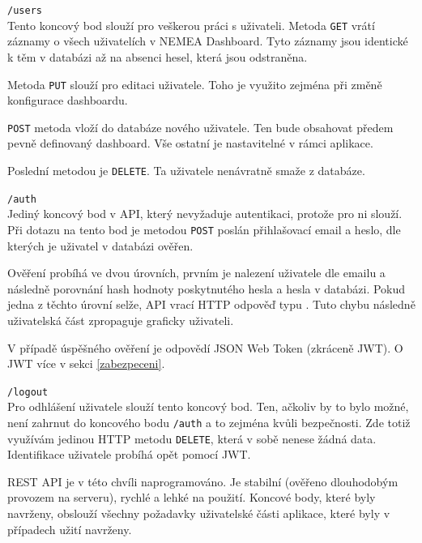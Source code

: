 \begin{description}
    \item \texttt{/users}\\
        Tento koncový bod slouží pro veškerou práci s uživateli. Metoda \texttt{GET} vrátí záznamy o všech uživatelích v NEMEA Dashboard. Tyto záznamy jsou identické k těm v databázi až na absenci hesel, která jsou odstraněna.

        Metoda \texttt{PUT} slouží pro editaci uživatele. Toho je využito zejména při změně konfigurace dashboardu.

        \texttt{POST} metoda vloží do databáze nového uživatele. Ten bude obsahovat předem pevně definovaný dashboard. Vše ostatní je nastavitelné v rámci aplikace.

        Poslední metodou je \texttt{DELETE}. Ta uživatele nenávratně smaže z databáze.

    \item \texttt{/auth}\\
        Jediný koncový bod v API, který nevyžaduje autentikaci, protože pro ni slouží. Při dotazu na tento bod je metodou \texttt{POST} poslán přihlašovací email a heslo, dle kterých je uživatel v databázi ověřen.

        Ověření probíhá ve dvou úrovních, prvním je nalezení uživatele dle emailu a následně porovnání hash hodnoty poskytnutého hesla a hesla v databázi. Pokud jedna z těchto úrovní selže, API vrací HTTP odpověď typu . Tuto chybu následně uživatelská část zpropaguje graficky uživateli.

        V případě úspěšného ověření je odpovědí JSON Web Token (zkráceně JWT)\cite{rfc:jwt}. O JWT více v sekci \ref{zabezpeceni}.

    \item \texttt{/logout}\\
        Pro odhlášení uživatele slouží tento koncový bod. Ten, ačkoliv by to bylo možné, není zahrnut do koncového bodu \texttt{/auth} a to zejména kvůli bezpečnosti. Zde totiž využívám jedinou HTTP metodu \texttt{DELETE}, která v sobě nenese žádná data. Identifikace uživatele probíhá opět pomocí JWT.
\end{description}

REST API je v této chvíli naprogramováno. Je stabilní (ověřeno dlouhodobým provozem na serveru), rychlé a lehké na použití. Koncové body, které byly navrženy, obslouží všechny požadavky uživatelské části aplikace, které byly v případech užití navrženy.

